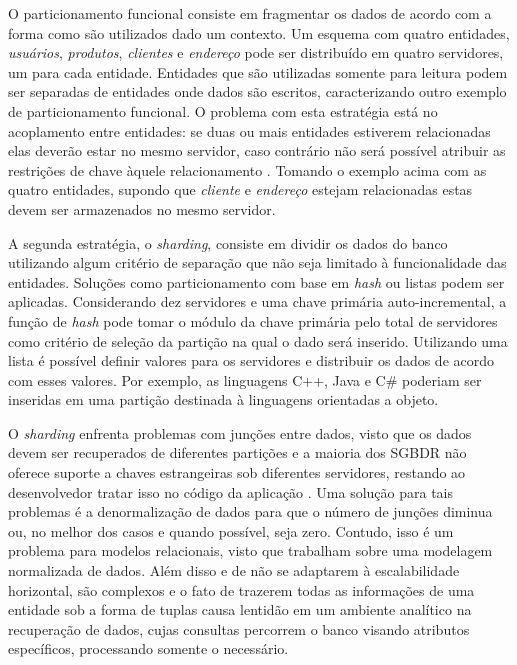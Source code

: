 O particionamento funcional consiste em fragmentar os dados de acordo 
com a forma como são utilizados dado um contexto. Um esquema com quatro entidades, 
\textit{usuários}, \textit{produtos}, \textit{clientes} e \textit{endereço} 
pode ser distribuído em quatro servidores, 
um para cada entidade. Entidades que são utilizadas somente para leitura podem 
ser separadas de entidades onde dados são escritos, caracterizando outro 
exemplo de particionamento funcional. O problema com esta estratégia está 
no acoplamento entre entidades: se duas ou mais entidades estiverem 
relacionadas elas deverão estar no mesmo servidor, caso contrário não 
será possível atribuir as restrições de chave àquele relacionamento \cite{pritchett2008base}. 
Tomando o exemplo acima com as quatro entidades, supondo que \textit{cliente} 
e \textit{endereço} estejam relacionadas estas devem 
ser armazenados no mesmo servidor. 

A segunda estratégia, o \textit{sharding}, consiste em dividir os dados do banco 
utilizando algum critério de separação que não seja limitado à 
funcionalidade das entidades. Soluções como particionamento com base em 
\textit{hash} ou listas podem ser aplicadas. Considerando dez servidores e uma chave 
primária auto-incremental, a função de \textit{hash} pode tomar o módulo da chave 
primária pelo total de servidores como critério de seleção da partição 
na qual o dado será inserido. Utilizando uma lista é possível definir valores 
para os servidores e distribuir os dados de acordo com esses valores. 
Por exemplo, as linguagens C++, Java e C\# poderiam ser inseridas em uma 
partição destinada à linguagens orientadas a objeto.

O \textit{sharding} enfrenta problemas com junções entre dados, visto que os dados 
devem ser recuperados de diferentes partições e a maioria dos SGBDR não 
oferece suporte a chaves estrangeiras sob diferentes servidores, restando 
ao desenvolvedor tratar isso no código da aplicação \cite{pritchett2008base}. 
Uma solução para tais 
problemas é a denormalização de dados para que o número de junções diminua ou, 
no melhor dos casos e quando possível, seja zero. Contudo, isso é um problema 
para modelos relacionais, visto que trabalham sobre uma modelagem normalizada de dados. 
Além disso e de não se adaptarem à escalabilidade horizontal, 
são complexos e o fato de trazerem todas as informações de uma entidade sob a 
forma de tuplas causa lentidão em um ambiente analítico na recuperação de dados, 
cujas consultas percorrem o banco visando atributos específicos, processando 
somente o necessário. 

